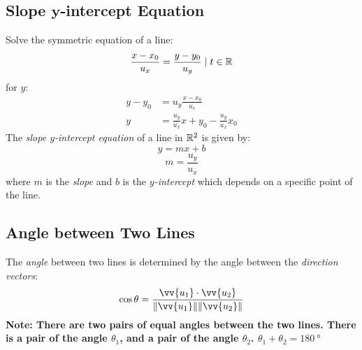 \subsection{Slope $\boldsymbol{y}$-intercept Equation}
	Solve the symmetric equation of a line:
	\[\frac{x - x_0}{u_x} = \frac{y - y_0}{u_y} \mid t \in \mathbb{R}\]
	for $y$:
	\begin{align*}
		y - y_0 &= u_y \frac{x - x_0}{u_x}\\
		y &= \frac{u_y}{u_x}x + y_0 - \frac{u_y}{u_x}x_0
	\end{align*}
	The \emph{slope $y$-intercept equation} of a line in $\mathbb{R}^2$ is given by:
	\[y = mx + b\]
	\[m = \frac{u_y}{u_x}\]
	where $m$ is the \emph{slope} and  $b$ is the \emph{$y$-intercept} which depends on a specific point of the line.
\subsection{Angle between Two Lines}
	The \emph{angle} between two lines is determined by the angle between the \emph{direction vectors}:
	\[\cos \theta = \frac{\vv{u_1} \cdot \vv{u_2}}{\norm{\vv{u_1}} \norm{\vv{u_2}}}\]
	\textbf{Note: There are two pairs of equal angles between the two lines.
	There is a pair of the angle $\theta_1$, and a pair of the angle $\theta_2$.
	$\theta_1 + \theta_2 = \SI{180}{\degree}$}
